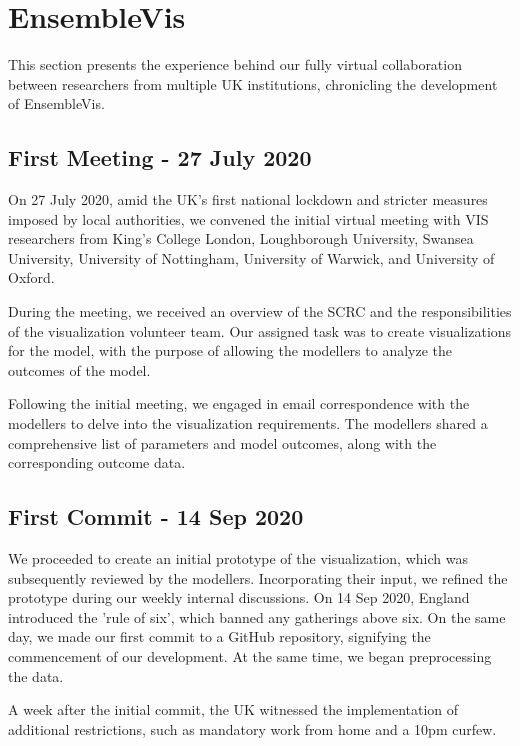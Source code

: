 \section{EnsembleVis}
\label{sec:EnsembleVis}

This section presents the experience behind our fully virtual collaboration between researchers from multiple UK institutions, chronicling the development of EnsembleVis.


\subsection{First Meeting - 27 July 2020}
\label{subsec:InitialMeeting}
On 27 July 2020, amid the UK's first national lockdown and stricter measures imposed by local authorities, we convened the initial virtual meeting with VIS researchers from King's College London, Loughborough University, Swansea University, University of Nottingham, University of Warwick, and University of Oxford.

During the meeting, we received an overview of the SCRC and the responsibilities of the visualization volunteer team.
Our assigned task was to create visualizations for the model, with the purpose of allowing the modellers to analyze the outcomes of the model.

Following the initial meeting, we engaged in email correspondence with the modellers to delve into the visualization requirements. The modellers shared a comprehensive list of parameters and model outcomes, along with the corresponding outcome data.
\subsection{First Commit - 14 Sep 2020}
We proceeded to create an initial prototype of the visualization, which was subsequently reviewed by the modellers.
Incorporating their input, we refined the prototype during our weekly internal discussions.
On 14 Sep 2020, England introduced the 'rule of six', which banned any gatherings above six.
On the same day, we made our first commit to a GitHub repository, signifying the commencement of our development.
At the same time, we began preprocessing the data.

A week after the initial commit, the UK witnessed the implementation of additional restrictions, such as mandatory work from home and a 10pm curfew.

